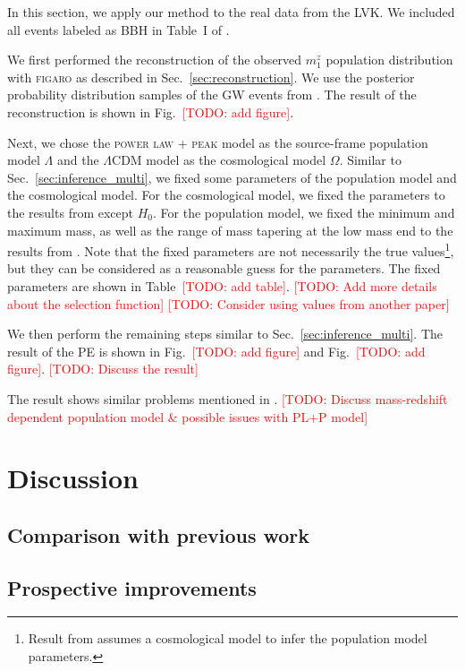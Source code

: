 \documentclass[twocolumn]{aastex631}
\newcommand{\todo}[1]{\textcolor{red}{[TODO: #1]}}
\begin{document}
In this section, we apply our method to the real data from the \ac{LVK}.
We included all events labeled as BBH in Table~I of \citet{KAGRA:2021duu}.

We first performed the reconstruction of the observed $m^z_1$ population distribution with \textsc{figaro} as described in Sec.~\ref{sec:reconstruction}.
We use the posterior probability distribution samples of the \ac{GW} events from \citet{LIGOScientific:2019lzm, KAGRA:2023pio}.
The result of the reconstruction is shown in Fig.~\todo{add figure}.

Next, we chose the \textsc{power law + peak} model as the source-frame population model $\Lambda$ and the $\Lambda$CDM model as the cosmological model $\Omega$.
Similar to Sec.~\ref{sec:inference_multi}, we fixed some parameters of the population model and the cosmological model.
For the cosmological model, we fixed the parameters to the results from \citet{Planck:2018vyg} except $H_0$.
For the population model, we fixed the minimum and maximum mass, as well as the range of mass tapering at the low mass end to the results from \citet{KAGRA:2021duu}.
Note that the fixed parameters are not necessarily the true values\footnote{Result from \citet{KAGRA:2021duu} assumes a cosmological model to infer the population model parameters.}, but they can be considered as a reasonable guess for the parameters.
The fixed parameters are shown in Table~\todo{add table}.
\todo{Add more details about the selection function}
\todo{Consider using values from another paper}

We then perform the remaining steps similar to Sec.~\ref{sec:inference_multi}.
The result of the \ac{PE} is shown in Fig.~\todo{add figure} and Fig.~\todo{add figure}.
\todo{Discuss the result}

The result shows similar problems mentioned in \citet{Pierra:2024wrk}.
\todo{Discuss mass-redshift dependent population model \& possible issues with PL+P model}

\section{Discussion}
\label{sec:discussion}

\subsection{Comparison with previous work}
\label{sec:comparison}

\subsection{Prospective improvements}
\label{sec:prospective}
\end{document}
